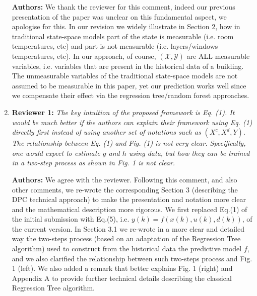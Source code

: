 \documentclass{article}
\begin{document}
\begin{enumerate}
\textbf{Authors:} We thank the reviewer for this comment, indeed our previous presentation of the paper was unclear on this fundamental aspect, we apologise for this. In our revision we widely illustrate in Section 2, how in traditional state-space models part of the state is measurable (i.e. room temperatures, etc) and part is not measurable (i.e. layers/windows temperatures, etc). In our approach, of course, $(\mathcal{X}, \mathcal{Y})$ are ALL measurable variables, i.e. variables that are present in the historical data of a building. The unmeasurable variables of the traditional state-space models are not assumed to be measurable in this paper, yet our prediction works well since we compensate their effect via the regression tree/random forest approaches.



\item \textbf{Reviewer 1:} \textit{The key intuition of the proposed framework is Eq. (1). It would be much better if the authors can explain their framework using Eq. (1) directly first instead of using another set of notations such as $(X^c, X^d, Y)$. The relationship between Eq. (1) and Fig. (1) is not very clear. Specifically, one would expect to estimate $g$ and $h$ using data, but how they can be trained in a two-step process as shown in Fig. 1 is not clear.}



\textbf{Authors:} We agree with the reviewer. Following this comment, and also other comments, we re-wrote the corresponding Section 3 (describing the DPC technical approach) to make the presentation and notation more clear and the mathematical description more rigorous. We first replaced Eq.(1) of the initial submission with Eq.(5), i.e. $y(k)=f(x(k),u(k),d(k))$, of the current version. In Section 3.1 we re-wrote in a more clear and detailed way the two-steps process (based on an adaptation of the Regression Tree algorithm) used to construct from the historical data the predictive model $f$, and we also clarified the relationship between such two-steps process and Fig. 1 (left). We also added a remark that better explains Fig. 1 (right) and Appendix A to provide further technical details describing the classical Regression Tree algorithm.


\end{enumerate}


\end{document}

